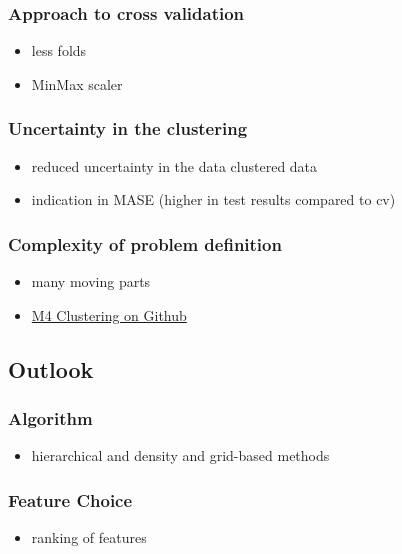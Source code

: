\documentclass[11pt]{article}
\begin{document}
\subsubsection*{Approach to cross validation}
\label{sec:orgdd3d84a}
\begin{itemize}
\item less folds
\item MinMax scaler
\end{itemize}
\subsubsection*{Uncertainty in the clustering}
\label{sec:orgd78a8d8}
\begin{itemize}
\item reduced uncertainty in the data clustered data
\item indication in MASE (higher in test results compared to cv)
\end{itemize}
\subsubsection*{Complexity of problem definition}
\label{sec:orgc5ae0e2}
\begin{itemize}
\item many moving parts
\item \href{https://github.com/philippbeer/m4\_clustering}{M4 Clustering on Github}
\end{itemize}
\subsection*{Outlook}
\label{sec:org347f478}
\subsubsection*{Algorithm}
\label{sec:org7e7f701}
\begin{itemize}
\item hierarchical and density and grid-based methods
\end{itemize}
\subsubsection*{Feature Choice}
\label{sec:orgd961f30}
\begin{itemize}
\item ranking of features
\end{itemize}
\end{document}
